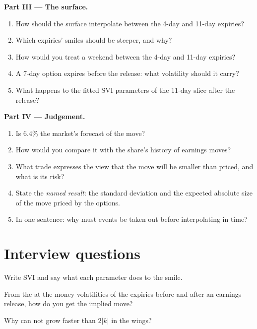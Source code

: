 \begin{problem}
\medskip\noindent\textbf{Part III --- The surface.}
\begin{enumerate}[resume]
\item How should the surface interpolate between the 4-day and 11-day expiries?
\item Which expiries' smiles should be steeper, and why?
\item How would you treat a weekend between the 4-day and 11-day expiries?
\item A 7-day option expires before the release: what volatility should it carry?
\item What happens to the fitted SVI parameters of the 11-day slice after the release?
\end{enumerate}

\medskip\noindent\textbf{Part IV --- Judgement.}
\begin{enumerate}[resume]
\item Is 6.4\% the market's forecast of the move?
\item How would you compare it with the share's history of earnings moves?
\item What trade expresses the view that the move will be smaller than priced, and what is its risk?
\item State the \emph{named result}: the standard deviation and the expected absolute size of the move
priced by the options.
\item In one sentence: why must events be taken out before interpolating in time?
\end{enumerate}
\end{problem}

\section{Interview questions}

\begin{interviewq}\label{iq:dv:parametrising-the-surface:1}
Write SVI and say what each parameter does to the smile.
\end{interviewq}

\begin{interviewq}\label{iq:dv:parametrising-the-surface:2}
From the at-the-money volatilities of the expiries before and after an earnings release, how do you get
the implied move?
\end{interviewq}

\begin{interviewq}\label{iq:dv:parametrising-the-surface:3}
Why can  not grow faster than $2|k|$ in the wings?
\end{interviewq}

